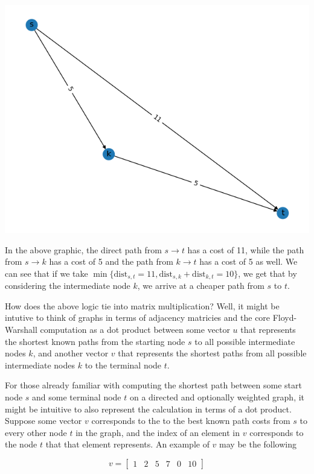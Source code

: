 \documentclass[12pt]{article}
\begin{document}
\begin{center}
    \includegraphics[scale=0.5]{media/Figure_1.png}
\end{center}

In the above graphic, the direct path from $s \to t$ has a cost of 11, while the path from $s \to k$ has a cost of 5 and the path from $k \to t$ has a cost of 5 as well. We can see that if we take $\min \{\mathrm{dist}_{s,t} = 11, \mathrm{dist}_{s,k} + \mathrm{dist}_{k,t} = 10 \}$, we get that by considering the intermediate node $k$, we arrive at a cheaper path from $s$ to $t$.

How does the above logic tie into matrix multiplication? Well, it might be intutive to think of graphs in terms of adjacency matricies and the core Floyd-Warshall computation as a dot product between some vector $u$ that represents the shortest known paths from the starting node $s$ to all possible intermediate nodes $k$, and another vector $v$ that represents the shortest paths from all possible intermediate nodes $k$ to the terminal node $t$.

For those already familiar with computing the shortest path between some start node $s$ and some terminal node $t$ on a directed and optionally weighted graph, it might be intuitive to also represent the calculation in terms of a dot product. Suppose some vector $v$ corresponds to the to the best known path costs from $s$ to every other node $t$ in the graph, and the index of an element in $v$ corresponds to the node $t$ that that element represents. An example of $v$ may be the following

\[
    v =
    \begin{bmatrix}
        1 & 2 & 5 & 7 & 0 & 10
    \end{bmatrix}
\]
\end{document}
